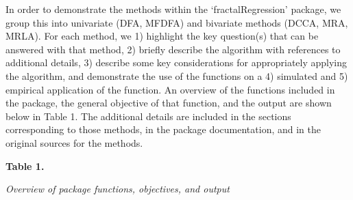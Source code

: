 \documentclass[
  man]{apa6}
\begin{document}
In order to demonstrate the methods within the `fractalRegression'
package, we group this into univariate (DFA, MFDFA) and bivariate
methods (DCCA, MRA, MRLA). For each method, we 1) highlight the key
question(s) that can be answered with that method, 2) briefly describe
the algorithm with references to additional details, 3) describe some
key considerations for appropriately applying the algorithm, and
demonstrate the use of the functions on a 4) simulated and 5) empirical
application of the function. An overview of the functions included in
the package, the general objective of that function, and the output are
shown below in Table 1. The additional details are included in the
sections corresponding to those methods, in the package documentation,
and in the original sources for the methods.

\textbf{Table 1.}

\emph{Overview of package functions, objectives, and output}
\end{document}
